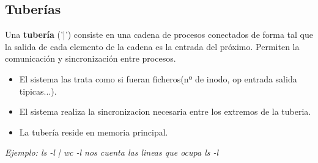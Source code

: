 \subsection{Tuberías}
Una \textbf{tubería} ('|') consiste en una cadena de procesos conectados de forma tal que la salida de cada elemento de la cadena es la entrada del próximo. Permiten la comunicación y sincronización entre procesos.\\

\begin{itemize}
    \item El sistema las trata como si fueran ficheros(nº de inodo, op entrada salida tipicas...).
    \item El sistema realiza la sincronizacion necesaria entre los extremos de la tuberia.
    \item La tubería reside en memoria principal.
\end{itemize}
\begin{center}
    \textit{Ejemplo: ls -l | wc -l nos cuenta las lineas que ocupa ls -l}
\end{center}

